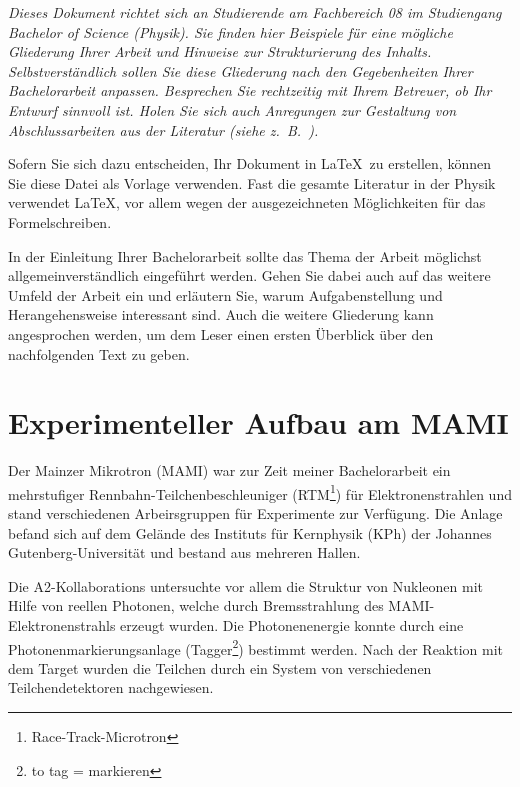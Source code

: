 \documentclass[a4paper,11pt,oneside,final,german,openbib,pdftex]{scrbook}
\begin{document}
{\em Dieses Dokument richtet sich an Studierende am Fachbereich 08 im 
Studiengang Bachelor of Science (Physik). Sie finden hier Beispiele 
f\"ur eine m\"ogliche Gliederung Ihrer Arbeit und Hinweise zur 
Strukturierung des Inhalts. Selbstverst\"andlich sollen Sie diese 
Gliederung nach den Gegebenheiten Ihrer Bachelorarbeit anpassen. 
Besprechen Sie rechtzeitig mit Ihrem Betreuer, ob Ihr Entwurf sinnvoll 
ist. Holen Sie sich auch Anregungen zur Gestaltung von Abschlussarbeiten 
aus der Literatur (siehe z.\ B.\ \cite{EbelBliefert}).
\medskip

Sofern Sie sich dazu entscheiden, Ihr Dokument in \LaTeX\ zu erstellen, 
k\"onnen Sie diese Datei als Vorlage verwenden. Fast die gesamte 
Literatur in der Physik verwendet \LaTeX, vor allem wegen der 
ausgezeichneten M\"oglichkeiten f\"ur das Formelschreiben.
}
\bigskip

In der Einleitung Ihrer Bachelorarbeit sollte das Thema der Arbeit 
m\"oglichst allgemeinverst\"andlich eingef\"uhrt werden. Gehen Sie 
dabei auch auf das weitere Umfeld der Arbeit ein und erl\"autern Sie, 
warum Aufgabenstellung und Herangehensweise interessant sind. Auch 
die weitere Gliederung kann angesprochen werden, um dem Leser einen 
ersten \"Uberblick \"uber den nachfolgenden Text zu geben.

\chapter{Experimenteller Aufbau am MAMI}





Der Mainzer Mikrotron (MAMI) war zur Zeit meiner Bachelorarbeit ein mehrstufiger Rennbahn-Teilchenbeschleuniger (RTM\footnote{Race-Track-Microtron}) für Elektronenstrahlen und stand verschiedenen Arbeirsgruppen
 für Experimente zur Verfügung. Die Anlage befand sich auf dem Gelände des Instituts für Kernphysik (KPh) der Johannes Gutenberg-Universität 
und bestand aus mehreren Hallen.

Die A2-Kollaborations untersuchte vor allem die Struktur von Nukleonen mit Hilfe von reellen Photonen, welche durch Bremsstrahlung des MAMI-Elektronenstrahls erzeugt wurden. Die Photonenenergie konnte durch eine Photonenmarkierungsanlage (Tagger\footnote{to tag = markieren}) bestimmt werden. Nach der Reaktion mit dem Target wurden die Teilchen durch ein System von verschiedenen Teilchendetektoren nachgewiesen.
\end{document}
